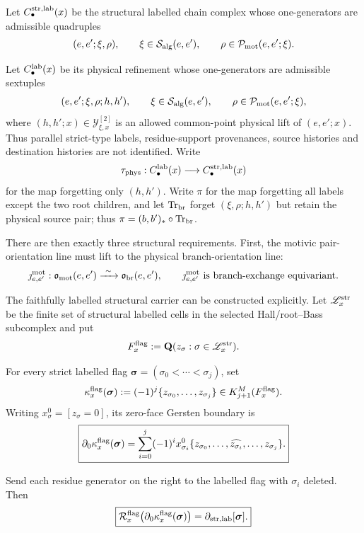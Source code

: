 \documentclass[11pt]{article}
\begin{document}
Let \(C_\bullet^{\rm str,lab}(x)\) be the structural labelled chain complex
whose one-generators are admissible quadruples
\[
 (e,e';\xi,\rho),
 \qquad
 \xi\in\mathcal S_{\rm alg}(e,e'),
 \qquad
 \rho\in\mathcal P_{\rm mot}(e,e';\xi).
\]

Let \(C_\bullet^{\rm lab}(x)\) be its physical refinement whose one-generators
are admissible sextuples
\[
 (e,e';\xi,\rho;h,h'),
 \qquad
 \xi\in\mathcal S_{\rm alg}(e,e'),
 \qquad
 \rho\in\mathcal P_{\rm mot}(e,e';\xi),
\]
where \((h,h';x)\in\mathscr Y_{\xi,x}^{[2]}\) is an allowed common-point
physical lift of \((e,e';x)\).  Thus parallel strict-type labels,
residue-support provenances, source histories and destination histories are
not identified.  Write
\[
 \tau_{\rm phys}:C_\bullet^{\rm lab}(x)
 \longrightarrow C_\bullet^{\rm str,lab}(x)
\]
for the map forgetting only \((h,h')\).  Write \(\pi\) for the map forgetting
all labels except the
two root children, and let \(\operatorname{Tr}_{\rm br}\) forget
\((\xi,\rho;h,h')\) but retain the physical source pair; thus
\(\pi=(b,b')_\ast\circ\operatorname{Tr}_{\rm br}\).


There are then exactly three structural requirements.  First, the motivic
pair-orientation line must lift
to the physical branch-orientation line:
\[
 \jmath_{e,e'}^{\rm mot}:
 \mathfrak o_{\rm mot}(e,e')
 \xrightarrow{\ \sim\ }
 \mathfrak o_{\rm br}(e,e'),
 \qquad
 \jmath_{e,e'}^{\rm mot}\ \text{is branch-exchange equivariant}.
\]

The faithfully labelled structural carrier can be constructed explicitly.
Let \(\mathscr L_x^{\rm str}\) be the finite set of structural labelled cells
in the selected Hall/root--Bass subcomplex and put
\[
 F_x^{\rm flag}
 :=\mathbf Q(z_\sigma:\sigma\in\mathscr L_x^{\rm str}).
\]

For every strict labelled flag
\(\boldsymbol\sigma=(\sigma_0<\cdots<\sigma_j)\), set
\[
 \kappa_x^{\rm flag}(\boldsymbol\sigma)
 :=(-1)^j\{z_{\sigma_0},\ldots,z_{\sigma_j}\}
 \in K_{j+1}^M(F_x^{\rm flag}).
\]
Writing \(x_\sigma^0=[z_\sigma=0]\), its zero-face Gersten boundary is
\begin{equation}\label{eq:coordinate-flag-gersten-boundary}
 \boxed{
 \partial_0\kappa_x^{\rm flag}(\boldsymbol\sigma)
 =
 \sum_{i=0}^j(-1)^i x_{\sigma_i}^0
 \{z_{\sigma_0},\ldots,\widehat{z_{\sigma_i}},\ldots,z_{\sigma_j}\}.}
\end{equation}

Send each residue generator on the right to the labelled flag with
\(\sigma_i\) deleted.  Then
\begin{equation}\label{eq:coordinate-flag-chain-realization}
 \boxed{
 \mathcal R_x^{\rm flag}
  \bigl(\partial_0\kappa_x^{\rm flag}(\boldsymbol\sigma)\bigr)
 =
 \partial_{\rm str,lab}[\boldsymbol\sigma].}
\end{equation}
\end{document}

